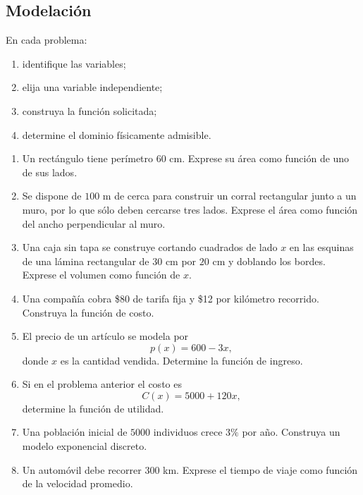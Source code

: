 \documentclass[12pt]{article}
\theoremstyle{remark}
\begin{document}
\subsection*{Modelación}

En cada problema:
\begin{enumerate}[label=\alph*)]
    \item identifique las variables;
    \item elija una variable independiente;
    \item construya la función solicitada;
    \item determine el dominio físicamente admisible.
\end{enumerate}

\begin{enumerate}
    \item Un rectángulo tiene perímetro $60$ cm. Exprese su área como función
    de uno de sus lados.

    \item Se dispone de $100$ m de cerca para construir un corral rectangular
    junto a un muro, por lo que sólo deben cercarse tres lados. Exprese el área
    como función del ancho perpendicular al muro.

    \item Una caja sin tapa se construye cortando cuadrados de lado $x$ en las
    esquinas de una lámina rectangular de $30$ cm por $20$ cm y doblando los
    bordes. Exprese el volumen como función de $x$.

    \item Una compañía cobra \$80 de tarifa fija y \$12 por kilómetro recorrido.
    Construya la función de costo.

    \item El precio de un artículo se modela por
    \[
    p(x)=600-3x,
    \]
    donde $x$ es la cantidad vendida. Determine la función de ingreso.

    \item Si en el problema anterior el costo es
    \[
    C(x)=5000+120x,
    \]
    determine la función de utilidad.

    \item Una población inicial de $5000$ individuos crece $3\%$ por año.
    Construya un modelo exponencial discreto.

    \item Un automóvil debe recorrer $300$ km. Exprese el tiempo de viaje como
    función de la velocidad promedio.
\end{enumerate}
\end{document}
